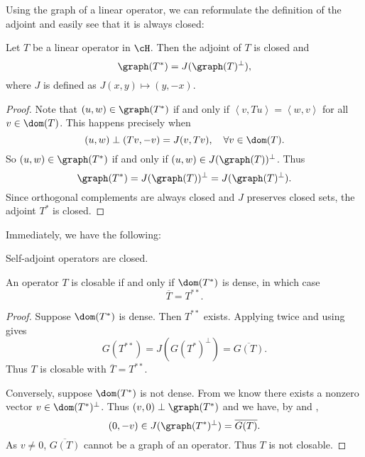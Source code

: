 \documentclass[oneside,reqno,letterpaper]{amsart}
\begin{document}
Using the graph of a linear operator, we can reformulate the definition of the adjoint and easily see that it is always closed:

\begin{proposition}
\label{thm:adjoint-graph}
  Let \(T\) be a linear operator in \(\cH\). Then the adjoint of \(T\) is closed and 
  \[
  \graph(T^*) = J(\graph(T)^\perp) , 
  \] 
  where \(J\) is defined as \(J(x, y) \mapsto (y, -x)\). 
\end{proposition}
\begin{proof}
  Note that \((u, w) \in \graph(T^*)\) if and only if \(\left< v, T u \right> = \left< w, v \right>\) for all \(v \in \dom(T)\). 
  This happens precisely when 
  \[
    (u, w) \perp (T v, -v) = J(v, T v), \quad \forall v \in \dom(T) . 
  \] 
  So \((u, w) \in \graph(T^*)\) if and only if \((u, w) \in J(\graph(T))^\perp\). 
  Thus
  \[
  \graph(T^*) = J(\graph(T))^\perp = J(\graph(T)^\perp) . 
  \] 
  Since orthogonal complements are always closed and \(J\) preserves closed sets, the adjoint \(T^*\) is closed. 
\end{proof}


Immediately, we have the following:
\begin{corollary}
\label{thm:self-adjoint-closed}
  Self-adjoint operators are closed. 
\end{corollary}

\begin{theorem}
\label{thm:double-adjoint}
  An operator \(T\) is closable if and only if \(\dom(T^*)\) is dense, in which case
  \[
    \overline{T} = T^{**} . 
  \] 
\end{theorem}
\begin{proof}
  Suppose \(\dom(T^*)\) is dense. 
  Then \(T^{**}\) exists. 
  Applying  twice and using  gives
  \[
  G(T^{**}) = J(G(T^*)^\perp) = \overline{G(T)} . 
  \] 
  Thus \(T\) is closable with \(\overline{T} = T^{**}\). 

  Conversely, suppose \(\dom(T^*)\) is not dense. 
  From  we know there exists a nonzero vector \(v \in \dom(T^*)^\perp\). 
  Thus \((v, 0) \perp \graph(T^*)\) and we have, by  and , 
  \[
    (0, -v) \in J(\graph(T^*)^\perp)  = \overline{G(T)} .
  \] 
  As \(v \neq 0\), \(\overline{G(T)}\) cannot be a graph of an operator.
  Thus \(T\) is not closable. 
\end{proof}
\end{document}
